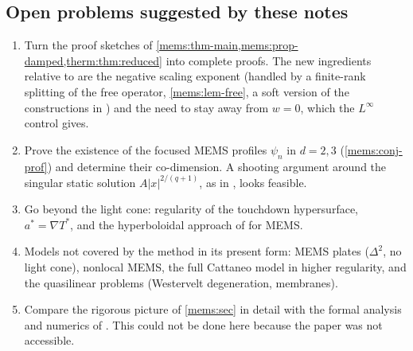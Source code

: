 \subsection{Open problems suggested by these notes}
\begin{enumerate}[leftmargin=1.5em]
\item Turn the proof sketches of
\cref{mems:thm-main,mems:prop-damped,therm:thm:reduced} into complete
proofs. The new ingredients relative to \cite{Ostermann2024} are the
negative scaling exponent (handled by a finite-rank splitting of the free
operator, \cref{mems:lem-free}, a soft version of the constructions in
\cite{Ostermann2024,Glogic2025}) and the need to stay away from $w=0$, which
the $L^\infty$ control gives.
\item Prove the existence of the focused MEMS profiles $\psi_n$ in $d=2,3$
(\cref{mems:conj-prof}) and determine their co-dimension. A shooting argument
around the singular static solution $A|x|^{2/(q+1)}$, as in
\cite{BizonMaisonWasserman2007}, looks feasible.
\item Go beyond the light cone: regularity of the touchdown hypersurface,
$a^*=\nabla T^*$, and the hyperboloidal approach of
\cite{BiernatDonningerSchoerkhuber2021,ChenEtAl2024} for MEMS.
\item Models not covered by the method in its present form: MEMS plates
($\Delta^2$, no light cone), nonlocal MEMS, the full Cattaneo model in
higher regularity, and the quasilinear problems (Westervelt degeneration,
membranes).
\item Compare the rigorous picture of \cref{mems:sec} in detail with the
formal analysis and numerics of \cite{GimperleinHeLacey2022,He2021}. This
could not be done here because the paper was not accessible.
\end{enumerate}
